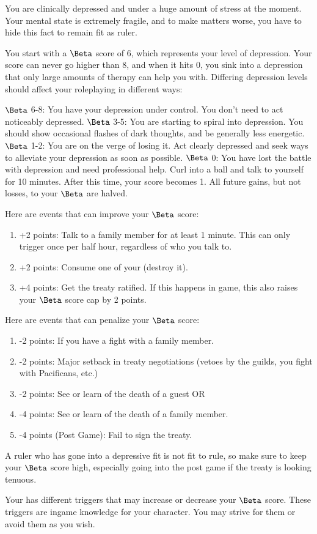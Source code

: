 \documentclass[green]{NeptuneBall}
\begin{document}
\name{\gSpellBreak{}}

You are clinically depressed and under a huge amount of stress at the moment. Your mental state is extremely fragile, and to make matters worse, you have to hide this fact to remain fit as ruler.

You start with a $\Beta$ score of 6, which represents your level of depression. Your score can never go higher than 8, and when it hits 0, you sink into a depression that only large amounts of therapy can help you with. Differing depression levels should affect your roleplaying in different ways:

$\Beta$ 6-8: You have your depression under control. You don't need to act noticeably depressed.
$\Beta$ 3-5: You are starting to spiral into depression. You should show occasional flashes of dark thoughts, and be generally less energetic.
$\Beta$ 1-2: You are on the verge of losing it. Act clearly depressed and seek ways to alleviate your depression as soon as possible.
$\Beta$ 0: You have lost the battle with depression and need professional help. Curl into a ball and talk to yourself for 10 minutes. After this time, your score becomes 1. All future gains, but not losses, to your $\Beta$ are halved.

Here are events that can improve your $\Beta$ score: 

\begin{enumerate}
\item +2 points: Talk to a family member for at least 1 minute. This can only trigger once per half hour, regardless of who you talk to.
\item +2 points: Consume one of your \iTablets{} (destroy it).
\item +4 points: Get the treaty ratified. If this happens in game, this also raises your $\Beta$ score cap by 2 points.
\end{enumerate}

Here are events that can penalize your $\Beta$ score:

\begin{enumerate}
\item -2 points: If you have a fight with a family member.
\item -2 points: Major setback in treaty negotiations (vetoes by the guilds, you fight with Pacificans, etc.)
\item -2 points: See or learn of the death of a guest OR
\item -4 points: See or learn of the death of a family member.
\item -4 points (Post Game): Fail to sign the treaty.
\end{enumerate}

A ruler who has gone into a depressive fit is not fit to rule, so make sure to keep your $\Beta$ score high, especially going into the post game if the treaty is looking tenuous. 

Your \mDepression{} has different triggers that may increase or decrease your $\Beta$ score. These triggers are ingame knowledge for your character. You may strive for them or avoid them as you wish.
\end{document}
